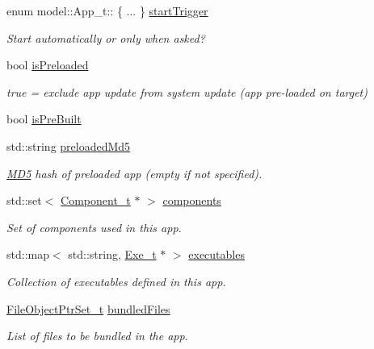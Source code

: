\begin{DoxyCompactItemize}
enum model\+::\+App\+\_\+t\+:: \{ ... \}  \hyperlink{structmodel_1_1_app__t_ab7ccd00b0c7976dfa1e09770d48d9ad6}{start\+Trigger}
\begin{DoxyCompactList}\small\item\em Start automatically or only when asked? \end{DoxyCompactList}\item 
bool \hyperlink{structmodel_1_1_app__t_acee00d508f8d26723d378f7944e197e2}{is\+Preloaded}
\begin{DoxyCompactList}\small\item\em true = exclude app update from system update (app pre-\/loaded on target) \end{DoxyCompactList}\item 
bool \hyperlink{structmodel_1_1_app__t_ae6dc949c8deecb9dea1ad97dc014083e}{is\+Pre\+Built}
\item 
std\+::string \hyperlink{structmodel_1_1_app__t_a6f89e232c59fe6f32bb8c7d68047ee00}{preloaded\+Md5}
\begin{DoxyCompactList}\small\item\em \hyperlink{class_m_d5}{M\+D5} hash of preloaded app (empty if not specified). \end{DoxyCompactList}\item 
std\+::set$<$ \hyperlink{structmodel_1_1_component__t}{Component\+\_\+t} $\ast$ $>$ \hyperlink{structmodel_1_1_app__t_ae221ab66d750cdc9723c84c976636480}{components}
\begin{DoxyCompactList}\small\item\em Set of components used in this app. \end{DoxyCompactList}\item 
std\+::map$<$ std\+::string, \hyperlink{structmodel_1_1_exe__t}{Exe\+\_\+t} $\ast$ $>$ \hyperlink{structmodel_1_1_app__t_a40e84ff274b81c8a0f2ceb69708aed59}{executables}
\begin{DoxyCompactList}\small\item\em Collection of executables defined in this app. \end{DoxyCompactList}\item 
\hyperlink{namespacemodel_aa2a6601c8a948122114a53c1aa584a23}{File\+Object\+Ptr\+Set\+\_\+t} \hyperlink{structmodel_1_1_app__t_a5501ad73d2b50f6635d5a46d3bc274a6}{bundled\+Files}
\begin{DoxyCompactList}\small\item\em List of files to be bundled in the app. \end{DoxyCompactList}\item 

\end{DoxyCompactItemize}
